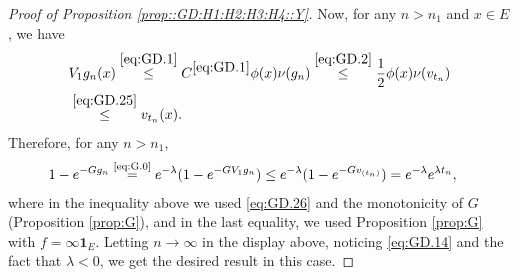 \documentclass[12pt,a4paper]{amsart}
\numberwithin{equation}{section}
\theoremstyle{plain}
\theoremstyle{definition}
\theoremstyle{remark}
\begin{document}
\begin{proof}[Proof of Proposition \ref{prop::GD:H1:H2:H3:H4::Y}]
	Now, for any $n>n_1$ and $x\in E$, we have
\begin{align}
	& V_1g_n(x)
	\overset{\eqref{eq:GD.1}}\leq C^{\eqref{eq:GD.1}} \phi(x)\nu(g_n)
	\overset{\eqref{eq:GD.2}}\leq \frac{1}{2}\phi(x)\nu(v_{t_n})
	\\\label{eq:GD.26} & \overset{\eqref{eq:GD.25}}\leq v_{t_n}(x).
\end{align}
	Therefore, for any $n>n_1$,
\begin{align}
	& 1 - e^{- Gg_n}
	\overset{\text{\eqref{eq:G.0}}}= e^{- \lambda} (1- e^{- GV_1g_n})
	\leq e^{- \lambda} (1- e^{- G v_{(t_n)}})
	= e^{- \lambda} e^{\lambda t_n},
\end{align}
	where in the inequality above we used \eqref{eq:GD.26} and the monotonicity of $G$ (Proposition \ref{prop:G}), and in the last equality, we used Proposition \ref{prop:G} with $f = \infty \mathbf 1_E$.
	Letting $n\to \infty$ in the display above, noticing \eqref{eq:GD.14} and the fact that $\lambda < 0$,
	we get the desired result in this case.


\end{proof}
\end{document}
